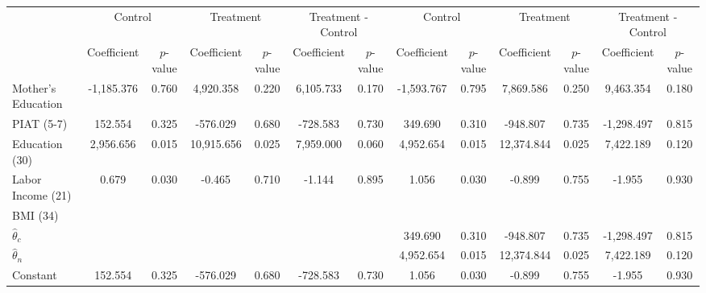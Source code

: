 \begin{tabular}{lcccccccccccc} \toprule
&\multicolumn{2}{c}{Control} & \multicolumn{2}{c}{Treatment} & \multicolumn{2}{c}{Treatment - Control} & \multicolumn{2}{c}{Control} & \multicolumn{2}{c}{Treatment} & \multicolumn{2}{c}{Treatment - Control} \\
 & Coefficient  & $p$-value  & Coefficient  & $p$-value & Coefficient  & $p$-value  & Coefficient  & $p$-value  & Coefficient  & $p$-value  & Coefficient  & $p$-value \\ \midrule
Mother's Education & -1,185.376 &     0.760 &  4,920.358 &     0.220 &  6,105.733 &     0.170 & -1,593.767 &     0.795 &  7,869.586 &     0.250 &  9,463.354 &     0.180 \\  
PIAT (5-7) &   152.554 &     0.325 &  -576.029 &     0.680 &  -728.583 &     0.730 &   349.690 &     0.310 &  -948.807 &     0.735 & -1,298.497 &     0.815 \\  
Education (30)  &  2,956.656 &     0.015 & 10,915.656 &     0.025 &  7,959.000 &     0.060 &  4,952.654 &     0.015 & 12,374.844 &     0.025 &  7,422.189 &     0.120 \\  
Labor Income (21) &     0.679 &     0.030 &    -0.465 &     0.710 &    -1.144 &     0.895 &     1.056 &     0.030 &    -0.899 &     0.755 &    -1.955 &     0.930 \\  
BMI (34) &        &        &        &        &        &        &        &        &        &        &        &         \\
$\hat{\theta}_{c}$ &        &        &        &        &        &        &   349.690 &     0.310 &  -948.807 &     0.735 & -1,298.497 &     0.815 \\  
$\hat{\theta}_{n}$ &        &        &        &        &        &        &  4,952.654 &     0.015 & 12,374.844 &     0.025 &  7,422.189 &     0.120 \\  
Constant &   152.554 &     0.325 &  -576.029 &     0.680 &  -728.583 &     0.730 &     1.056 &     0.030 &    -0.899 &     0.755 &    -1.955 &     0.930 \\  
\bottomrule \end{tabular}